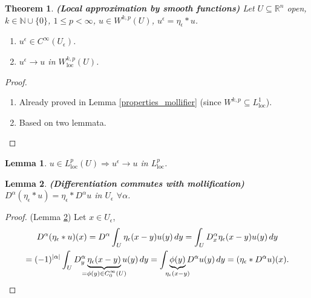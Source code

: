 \documentclass[12pt]{article}
\newtheorem{lemma}{Lemma}[section]
\newtheorem{theorem}{Theorem}[section]
\theoremstyle{definition}
\begin{document}
\begin{theorem}\label{local_approx_smooth}
\emph{\textbf{(Local approximation by smooth functions)}} Let $U\subseteq\mathbb{R}^n$ open, $k\in\mathbb{N}\cup\{0\}$, $1\leq p<\infty$, $u\in W^{k,p}(U)$, $u^{\epsilon}=\eta_{\epsilon}*u$.

\begin{enumerate}[label=(\roman*)]
\item $u^{\epsilon}\in C^{\infty}(U_{\epsilon})$.

\item\label{conv_Sobolev_loc} $u^{\epsilon}\rightarrow u$ in $W_{\text{loc}}^{k,p}(U)$.
\end{enumerate}
\end{theorem}

\begin{proof}
\begin{enumerate}[label=(\roman*)]
\item Already proved in Lemma \ref{properties_mollifier} (since $W^{k,p}\subseteq L_{\text{loc}}^1$).

\item Based on two lemmata.
\end{enumerate}
\end{proof}

\begin{lemma}\label{conv_moll_loc}
$u\in L_{\text{loc}}^p(U)\Rightarrow u^{\epsilon}\rightarrow u$ in $L_{\text{loc}}^p$.
\end{lemma}

\begin{lemma}\label{diff_comm_moll}
\emph{\textbf{(Differentiation commutes with mollification)}} $D^{\alpha}(\eta_{\epsilon}*u)=\eta_{\epsilon}*D^{\alpha}u$ in $U_{\epsilon}$ $\forall\alpha$.
\end{lemma}

\begin{proof}
(Lemma \ref{diff_comm_moll}) Let $x\in U_{\epsilon}$,
\begin{multline*}
D^{\alpha}(\eta_{\epsilon}*u)(x)=D^{\alpha}\int_U\eta_{\epsilon}(x-y)u(y)\,dy=\int_UD_x^{\alpha}\eta_{\epsilon}(x-y)u(y)\,dy\\
=(-1)^{|\alpha|}\int_UD_y^{\alpha}\underbrace{\eta_{\epsilon}(x-y)}_{\mathclap{=\phi(y)\in C_0^{\infty}(U)}}u(y)\,dy=\int\underbrace{\phi(y)}_{\mathclap{\eta_{\epsilon}(x-y)}}D^{\alpha}u(y)\,dy=(\eta_{\epsilon}*D^{\alpha}u)(x).
\end{multline*}
\end{proof}
\end{document}
